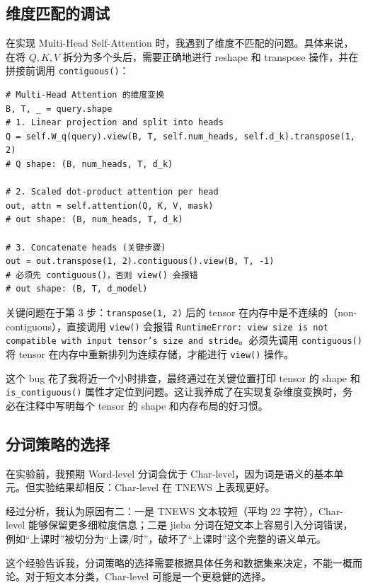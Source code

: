 \documentclass[a4paper]{article}
\begin{document}
\subsection{维度匹配的调试}

在实现 Multi-Head Self-Attention 时，我遇到了维度不匹配的问题。具体来说，在将 $Q, K, V$ 拆分为多个头后，需要正确地进行 reshape 和 transpose 操作，并在拼接前调用 \texttt{contiguous()}：

\begin{codebox}
\begin{lstlisting}[style=pyframe]
# Multi-Head Attention 的维度变换
B, T, _ = query.shape
# 1. Linear projection and split into heads
Q = self.W_q(query).view(B, T, self.num_heads, self.d_k).transpose(1, 2)
# Q shape: (B, num_heads, T, d_k)

# 2. Scaled dot-product attention per head
out, attn = self.attention(Q, K, V, mask)
# out shape: (B, num_heads, T, d_k)

# 3. Concatenate heads (关键步骤)
out = out.transpose(1, 2).contiguous().view(B, T, -1)
# 必须先 contiguous()，否则 view() 会报错
# out shape: (B, T, d_model)
\end{lstlisting}
\end{codebox}

关键问题在于第 3 步：\texttt{transpose(1, 2)} 后的 tensor 在内存中是不连续的（non-contiguous），直接调用 \texttt{view()} 会报错 \texttt{RuntimeError: view size is not compatible with input tensor's size and stride}。必须先调用 \texttt{contiguous()} 将 tensor 在内存中重新排列为连续存储，才能进行 \texttt{view()} 操作。

这个 bug 花了我将近一个小时排查，最终通过在关键位置打印 tensor 的 shape 和 \texttt{is\_contiguous()} 属性才定位到问题。这让我养成了在实现复杂维度变换时，务必在注释中写明每个 tensor 的 shape 和内存布局的好习惯。

\subsection{分词策略的选择}

在实验前，我预期 Word-level 分词会优于 Char-level，因为词是语义的基本单元。但实验结果却相反：Char-level 在 TNEWS 上表现更好。

经过分析，我认为原因有二：一是 TNEWS 文本较短（平均 22 字符），Char-level 能够保留更多细粒度信息；二是 jieba 分词在短文本上容易引入分词错误，例如“上课时”被切分为“上课/时”，破坏了“上课时”这个完整的语义单元。

这个经验告诉我，分词策略的选择需要根据具体任务和数据集来决定，不能一概而论。对于短文本分类，Char-level 可能是一个更稳健的选择。
\end{document}
